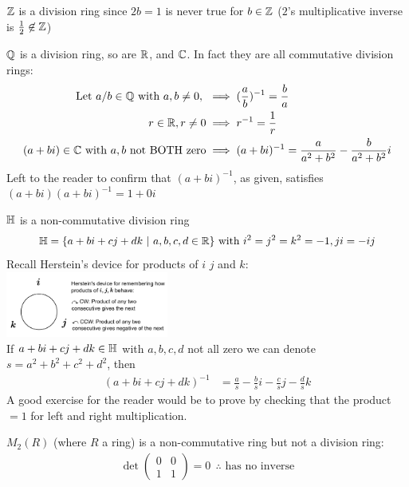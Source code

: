 \begin{example}
    ${\mathbb{ Z}}$ is  a division ring since $2b=1$ is never true for $b\in {\mathbb{ Z}}$ ($2$'s multiplicative inverse is $\frac{1}{2} \not \in {\mathbb{ Z}}$)
\end{example}
\begin{example}
    ${\mathbb{ Q}}$ is a division ring, so are ${\mathbb{ R}}$, and ${\mathbb{ C}}$. In fact they are all commutative division rings: \steezybreak\\
    
    \begin{align}
        \text{Let }  a/b \in \Q \text{ with } a,b\neq 0,  \ &\implies (\frac{a}{b})^{-1} = \frac{b}{a} \nonumber \\
        r \in \R, r\neq 0 &\implies r^{-1}=\frac{1}{r} \nonumber \\
        (a+bi)\in \C \text{ with $a,b$ not BOTH zero} &\implies (a+bi)^{-1} = \frac{a}{a^2+b^2} - \frac{b}{a^2+b^2}i \nonumber
    \end{align}
    Left to the reader to confirm that $(a+bi)^{-1}$, as given, satisfies $(a+bi)(a+bi)^{-1} = 1+0i$
\end{example}

\begin{example}
    ${\mathbb{ H}}$ is a non-commutative division ring
    \begin{align}
        {\mathbb{ H}} = \{a+bi+cj+dk \ | \ a,b,c,d \in {\mathbb{ R}} \} \text{ with } i^2=j^2=k^2=-1, ji = -ij \nonumber
    \end{align}
    Recall Herstein's device for products of $i$ $j$ and $k$: \includegraphics[width= 0.4\textwidth]{Figures/Herstein_quat_device.pdf} \steezybreak\\
    \noindent If $a+bi+cj+dk \in {\mathbb{ H}}$ with $a,b,c,d$ not all zero we can denote $s= a^2+b^2+c^2+d^2$, then
    \begin{align}
        (a+bi+cj+dk)^{-1}&= \frac{a}{s} - \frac{b}{s}i - \frac{c}{s}j - \frac{d}{s}k\nonumber
    \end{align}
    A good exercise for the reader would be to prove by checking that the product $=1$ for left and right multiplication.
\end{example}

\begin{example} 
    $M_2(R)$ (where $R$ a ring) is a non-commutative ring but not a division ring:
    \begin{align}
        \det\begin{pmatrix}
            0&0\\1&1
        \end{pmatrix} = 0 \ \ \therefore \text{ has no inverse} \nonumber
    \end{align}
\end{example}

